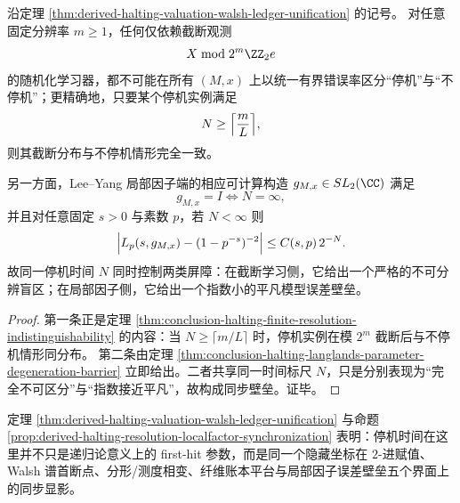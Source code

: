 \begin{proposition}[有限分辨率盲区与局部因子误差壁垒的同步化]\label{prop:derived-halting-resolution-localfactor-synchronization}
沿定理 \ref{thm:derived-halting-valuation-walsh-ledger-unification} 的记号。
对任意固定分辨率 \(m\ge 1\)，任何仅依赖截断观测
\[
X\bmod 2^m\ZZ_2 e
\]
的随机化学习器，都不可能在所有 \((M,x)\) 上以统一有界错误率区分“停机”与“不停机”；更精确地，只要某个停机实例满足
\[
N\ge \Bigl\lceil\frac{m}{L}\Bigr\rceil,
\]
则其截断分布与不停机情形完全一致。

另一方面，Lee--Yang 局部因子端的相应可计算构造 \(g_{M,x}\in SL_2(\CC)\) 满足
\[
g_{M,x}=I \iff N=\infty,
\]
并且对任意固定 \(s>0\) 与素数 \(p\)，若 \(N<\infty\) 则
\[
\Bigl|L_p(s,g_{M,x})-(1-p^{-s})^{-2}\Bigr|
\le C(s,p)\,2^{-N}.
\]
故同一停机时间 \(N\) 同时控制两类屏障：在截断学习侧，它给出一个严格的不可分辨盲区；在局部因子侧，它给出一个指数小的平凡模型误差壁垒。
\end{proposition}

\begin{proof}
第一条正是定理 \ref{thm:conclusion-halting-finite-resolution-indistinguishability}
的内容：当 \(N\ge \lceil m/L\rceil\) 时，停机实例在模 \(2^m\) 截断后与不停机情形同分布。
第二条由定理
\ref{thm:conclusion-halting-langlands-parameter-degeneration-barrier}
立即给出。二者共享同一时间标尺 \(N\)，只是分别表现为“完全不可区分”与“指数接近平凡”，故构成同步壁垒。证毕。
\end{proof}

\begin{remark}[赋值、频谱与账本的共同坐标]\label{rem:derived-halting-threefold-coordinate}
定理 \ref{thm:derived-halting-valuation-walsh-ledger-unification} 与命题
\ref{prop:derived-halting-resolution-localfactor-synchronization}
表明：停机时间在这里并不只是递归论意义上的 first-hit 参数，而是同一个隐藏坐标在 \(2\)-进赋值、Walsh 谱首断点、分形/测度相变、纤维账本平台与局部因子误差壁垒五个界面上的同步显影。
\end{remark}

\endinput
